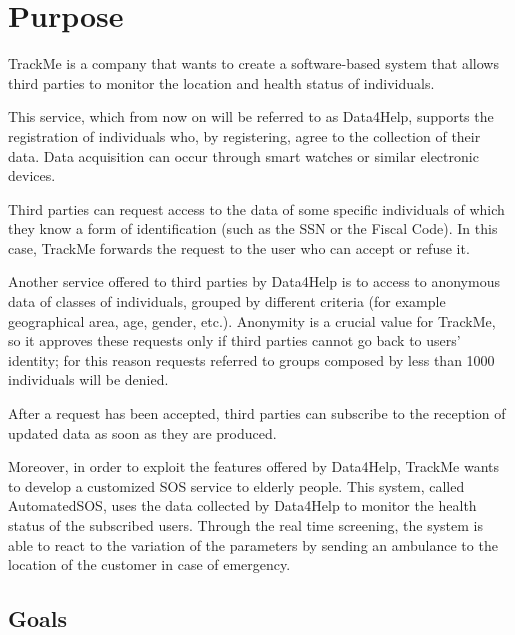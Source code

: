 \section{Purpose}
TrackMe is a company that wants to create a software-based system that allows third parties to monitor the location and health status of individuals. 
\par This service, which from now on will be referred to as Data4Help, supports the registration of individuals who, by registering, agree to the collection of their data. Data acquisition can occur through smart watches or similar electronic devices.
\par Third parties can request access to the data of some specific individuals of which they know a form of identification (such as the SSN or the Fiscal Code). In this case, TrackMe forwards the request to the user who can accept or refuse it.
\par Another service offered to third parties by Data4Help is to access to anonymous data of classes of individuals, grouped by different criteria (for example geographical area, age, gender, etc.). Anonymity is a crucial value for TrackMe, so it approves these requests only if third parties cannot go back to users' identity; for this reason requests referred to groups composed by less than 1000 individuals will be denied.
\par After a request has been accepted, third parties can subscribe to the reception of updated data as soon as they are produced.
\par Moreover, in order to exploit the features offered by Data4Help, TrackMe wants to develop a customized SOS service to elderly people. This system, called AutomatedSOS, uses the data collected by Data4Help to monitor the health status of the subscribed users. Through the real time screening, the system is able to react to the variation of the parameters by sending an ambulance to the location of the customer in case of emergency.
\pagebreak
\subsection{Goals}

